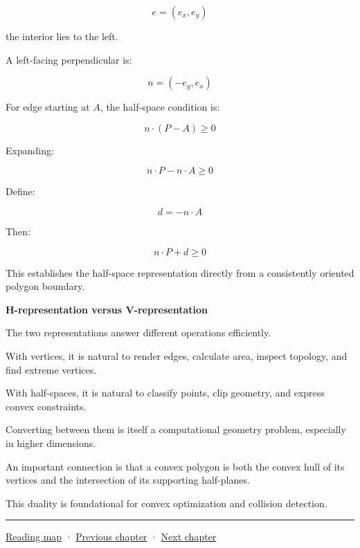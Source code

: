 \[
e=(e_x,e_y)
\]

the interior lies to the left.

A left-facing perpendicular is:

\[
\boxed{n=(-e_y,e_x)}
\]

For edge starting at \(A\), the half-space condition is:

\[
n\cdot(P-A)\ge0
\]

Expanding:

\[
n\cdot P-n\cdot A\ge0
\]

Define:

\[
d=-n\cdot A
\]

Then:

\[
n\cdot P+d\ge0
\]

This establishes the half-space representation directly from a consistently oriented polygon boundary.

\textbf{H-representation versus V-representation}

The two representations answer different operations efficiently.

With vertices, it is natural to render edges, calculate area, inspect topology, and find extreme vertices.

With half-spaces, it is natural to classify points, clip geometry, and express convex constraints.

Converting between them is itself a computational geometry problem, especially in higher dimensions.

An important connection is that a convex polygon is both the convex hull of its vertices and the intersection of its supporting half-planes.

This duality is foundational for convex optimization and collision detection.

\begin{center}\rule{0.5\linewidth}{0.5pt}\end{center}

\hyperref[volume-reading-map]{Reading map} · \hyperref[03-visual-computing-i-ch020-geometry-queries-from-scene-to-contact]{Previous chapter} · \hyperref[04-visual-computing-ii-ch022-convex-support-mapping-and-distance]{Next chapter}
